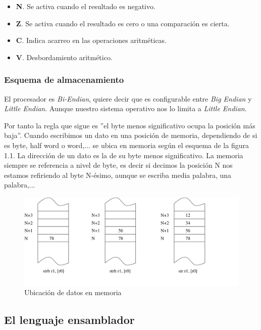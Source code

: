 \begin{descript}
    \begin{itemize}
      \item{\textbf{N}. Se activa cuando el resultado es negativo.}
      \item{\textbf{Z}. Se activa cuando el resultado es cero o una comparación es cierta.}
      \item{\textbf{C}. Indica acarreo en las operaciones aritméticas.}
      \item{\textbf{V}. Desbordamiento aritmético.}
    \end{itemize}
\end{descript}


\subsubsection{Esquema de almacenamiento}

El procesador es {\it Bi-Endian}, quiere decir que es configurable entre {\it Big Endian}
y {\it Little Endian}. Aunque nuestro sistema operativo nos lo limita a {\it Little Endian}.

Por tanto la regla que sigue es ''el byte menos significativo ocupa la posición más baja''.
Cuando escribimos un dato en una posición de memoria, dependiendo de si es byte, half word
o word,... se ubica en memoria según el esquema de la figura 1.1. La dirección de un dato
es la de su byte menos significativo. La memoria siempre se referencia a nivel de byte, es
decir si decimos la posición N nos estamos refiriendo al byte N-ésimo, aunque se escriba
media palabra, una palabra,...

\begin{figure}[h]
  \centering
    \includegraphics[width=13cm]{graphs/memo.pdf}
  \caption{Ubicación de datos en memoria}
  \label{fig:memo}
\end{figure}

\subsection{El lenguaje ensamblador}


